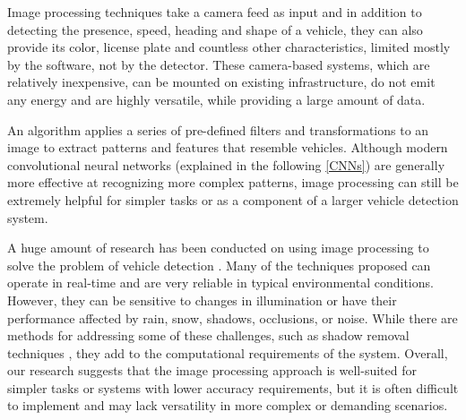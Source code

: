 
Image processing techniques take a camera feed as input and in addition to
detecting the presence, speed, heading and shape of a vehicle, they can also
provide its color, license plate and countless other characteristics, limited
mostly by the software, not by the detector. These camera-based systems, which
are relatively inexpensive, can be mounted on existing infrastructure, do not
emit any energy and are highly versatile, while providing a large amount of
data.

An algorithm applies a series of pre-defined filters and transformations to an
image to extract patterns and features that resemble vehicles. Although modern
convolutional neural networks (explained in the following \autoref{CNNs}) are
generally more effective at recognizing more complex patterns, image processing
can still be extremely helpful for simpler tasks or as a component of a larger
vehicle detection system.

A huge amount of research has been conducted on using image processing to solve
the problem of vehicle detection \cite{ImageProcessingOverview}. Many of the
techniques proposed can operate in real-time and are very reliable in typical
environmental conditions. However, they can be sensitive to changes in
illumination or have their performance affected by rain, snow, shadows,
occlusions, or noise. While there are methods for addressing some of these
challenges, such as shadow removal techniques \cite{ShadowRemoval}, they add to
the computational requirements of the system. Overall, our research suggests
that the image processing approach is well-suited for simpler tasks or systems
with lower accuracy requirements, but it is often difficult to implement and may
lack versatility in more complex or demanding scenarios.





